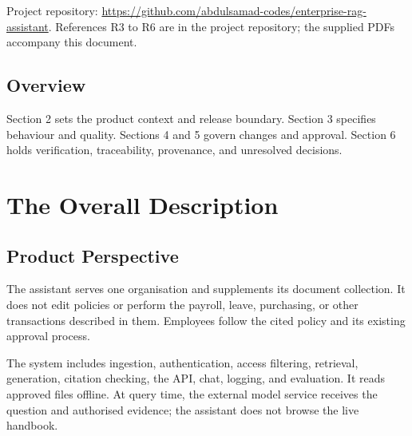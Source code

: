 \documentclass[11pt,letterpaper]{article}
\begin{document}
\endgroup

Project repository: \url{https://github.com/abdulsamad-codes/enterprise-rag-assistant}. References R3 to R6 are in the project repository; the supplied PDFs accompany this document.\par

\subsection{Overview}

Section 2 sets the product context and release boundary. Section 3 specifies behaviour and quality. Sections 4 and 5 govern changes and approval. Section 6 holds verification, traceability, provenance, and unresolved decisions.\par

\clearpage

\section{The Overall Description}

\subsection{Product Perspective}

The assistant serves one organisation and supplements its document collection. It does not edit policies or perform the payroll, leave, purchasing, or other transactions described in them. Employees follow the cited policy and its existing approval process.\par

The system includes ingestion, authentication, access filtering, retrieval, generation, citation checking, the API, chat, logging, and evaluation. It reads approved files offline. At query time, the external model service receives the question and authorised evidence; the assistant does not browse the live handbook.\par

\begingroup\small
\end{document}
